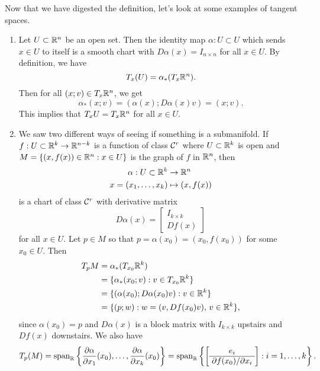 Now that we have digested the definition, let's look at some examples of tangent spaces.
\begin{enumerate}[(1)]
    \item Let $U \subset \mathbb{R}^n$ be an open set. Then the identity map 
    $\alpha : U \subset U$ which sends $x \in U$ to itself is a smooth 
    chart with $D\alpha(x) = I_{n\times n}$ for all $x \in U$. By 
    definition, we have  
    \[ T_x(U) = \alpha_*(T_x\mathbb{R}^n). \] 
    Then for all $(x; v) \in T_x\mathbb{R}^n$, we get 
    \[ \alpha_*(x; v) = (\alpha(x); D\alpha(x)v) = (x; v). \] 
    This implies that $T_xU = T_x\mathbb{R}^n$ for all $x \in U$. 

    \item We saw two different ways of seeing if something is a submanifold. If $f : U \subset \mathbb{R}^k 
    \to \mathbb{R}^{n-k}$ is a function of class ${\cal C}^r$ where $U \subset \mathbb{R}^k$ is open and 
    $M = \{(x, f(x)) \in \mathbb{R}^n : x \in U\}$ is the graph of $f$ in $\mathbb{R}^n$, then 
    \begin{align*}
        \alpha : U \subset \mathbb{R}^k &\to \mathbb{R}^n \\ 
        x = (x_1, \dots, x_k) &\mapsto (x, f(x))
    \end{align*}
    is a chart of class ${\cal C}^r$ with derivative matrix 
    \[ D\alpha(x) = \left[ \begin{array}{c} 
        I_{k\times k} \\\hline \!Df(x)\!
    \end{array} \right] \] 
    for all $x \in U$. Let $p \in M$ so that $p = \alpha(x_0) = (x_0, f(x_0))$ for some $x_0 \in U$. Then 
    \begin{align*} 
        T_pM &= \alpha_*(T_{x_0}\mathbb{R}^k) \\
        &= \{\alpha_*(x_0; v) : v \in T_{x_0}\mathbb{R}^k\} \\
        &= \{(\alpha(x_0); D\alpha(x_0)v) : v \in \mathbb{R}^k\} \\ 
        &= \{(p; w) : w = (v, Df(x_0)v),\, v \in \mathbb{R}^k\}, 
    \end{align*} 
    since $\alpha(x_0) = p$ and $D\alpha(x)$ is a block matrix with $I_{k\times k}$ 
    upstairs and $Df(x)$ downstairs. We also have 
    \[ T_p(M) = {\rm span}_{\mathbb{R}} \left\{ \frac{\partial\alpha}{\partial x_1}(x_0), \dots, 
    \frac{\partial\alpha}{\partial x_k}(x_0) \right\} = {\rm span}_{\mathbb{R}} 
    \left\{ \left[ \begin{array}{c} 
        e_i \\\hline \!\partial f(x_0)/\partial x_i\!
    \end{array} \right] : 
    i = 1, \dots, k \right\}. \] 


\end{enumerate}
